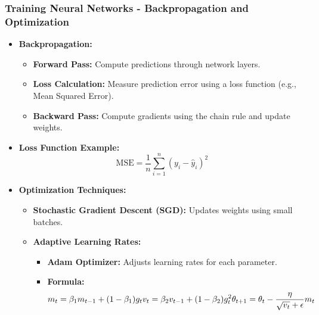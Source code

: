\documentclass[aspectratio=169]{beamer}
\begin{document}
\begin{frame}[fragile]
    \frametitle{Training Neural Networks - Backpropagation and Optimization}
    \begin{itemize}
        \item \textbf{Backpropagation:}
            \begin{itemize}
                \item \textbf{Forward Pass:} Compute predictions through network layers.
                \item \textbf{Loss Calculation:} Measure prediction error using a loss function (e.g., Mean Squared Error).
                \item \textbf{Backward Pass:} Compute gradients using the chain rule and update weights.
            \end{itemize}
        \item \textbf{Loss Function Example:}
        \begin{equation}
        \text{MSE} = \frac{1}{n} \sum_{i=1}^{n} (y_i - \hat{y}_i)^2
        \end{equation}
        \item \textbf{Optimization Techniques:}
            \begin{itemize}
                \item \textbf{Stochastic Gradient Descent (SGD):} Updates weights using small batches.
                \item \textbf{Adaptive Learning Rates:}
                    \begin{itemize}
                        \item \textbf{Adam Optimizer:} Adjusts learning rates for each parameter.
                        \item \textbf{Formula:}
                        \begin{equation}
                        m_t = \beta_1 m_{t-1} + (1 - \beta_1) g_t \\
                        v_t = \beta_2 v_{t-1} + (1 - \beta_2) g_t^2 \\
                        \theta_{t+1} = \theta_t - \frac{\eta}{\sqrt{v_t} + \epsilon} m_t
                        \end{equation}
                    \end{itemize}
            \end{itemize}
    \end{itemize}
\end{frame}
\end{document}
